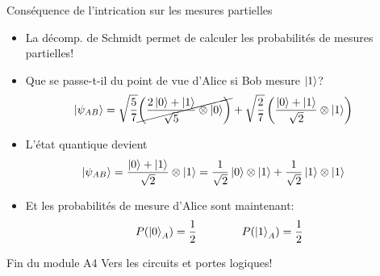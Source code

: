 \documentclass[aspectratio=169,12pt]{beamer}
\begin{document}
\begin{frame}{Conséquence de l'intrication sur les mesures partielles}
  \begin{itemize}[<+->]
    \item La décomp. de Schmidt permet de calculer les probabilités de mesures partielles!
    \item Que se passe-t-il du point de vue d'Alice si Bob mesure $\ket{1}$?
    \begin{align*}
      \ket{\psi_{AB}} 
      &= \sqrt{\frac{5}{7}} \cancel{\left( \frac{2\ket{0}+\ket{1}}{\sqrt{5}} \otimes \ket{0} \right)} + \sqrt{\frac{2}{7}} \left( \frac{\ket{0}+\ket{1}}{\sqrt{2}} \otimes \ket{1} \right)
    \end{align*}
    \item L'état quantique devient
    \begin{align*}
      \ket{\psi_{AB}} 
      &= \frac{\ket{0}+\ket{1}}{\sqrt{2}} \otimes \ket{1} = \frac{1}{\sqrt{2}} \ket{0} \otimes \ket{1} + \frac{1}{\sqrt{2}} \ket{1} \otimes \ket{1}
    \end{align*}
    \item Et les probabilités de mesure d'Alice sont maintenant:
    \begin{equation*}
      P(\ket{0}_A) = \frac{1}{2} \qquad\qquad P(\ket{1}_A) = \frac{1}{2}
    \end{equation*}
  \end{itemize}
\end{frame}

\begin{frame}{Fin du module A4}
    \centering
  \vfill
  Vers les circuits et portes logiques!
  \vfill
\end{frame}
\end{document}
